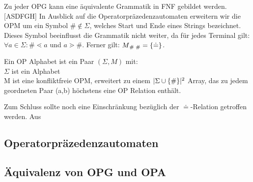 Zu jeder OPG kann eine äquivalente Grammatik in FNF gebildet werden. [ASDFGH]
In Ausblick auf die Operatorpräzedenzautomaten erweitern wir die OPM um ein Symbol $\# \notin \Sigma$, welches Start und Ende eines Strings bezeichnet. Dieses Symbol beeinflusst die Grammatik nicht weiter, da für jedes Terminal gilt: $\forall a \in \Sigma: \# \lessdot a $ und $a \gtrdot \#$. Ferner gilt: $M\textsubscript{\# \#}=\{ \doteq \}$.
\begin{definition}
Ein OP Alphabet ist ein Paar $(\Sigma, M)$ mit:\\
$\Sigma$ ist ein Alphabet \\
M ist eine konfliktfreie OPM, erweitert zu einem $ |\Sigma \cup \{\#\}|\textsuperscript{2}$ Array, das zu jedem geordneten Paar (a,b) höchstens eine OP Relation enthält.
\end{definition} 
Zum Schluss sollte noch eine Einschränkung bezüglich der $\doteq$-Relation getroffen werden. Aus

\subsection{Operatorpräzedenzautomaten}

\subsection{Äquivalenz von OPG und OPA}